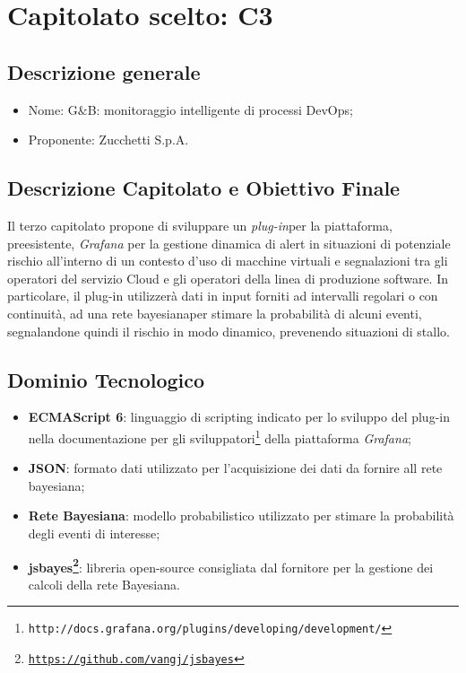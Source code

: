 \section{Capitolato scelto: C3}\label{CapScelto}

\subsection{Descrizione generale}
\begin{itemize}
	\item Nome: G$\&$B: monitoraggio intelligente di processi DevOps;
	\item Proponente: Zucchetti S.p.A.
\end{itemize}

\subsection{Descrizione Capitolato e Obiettivo Finale}
Il terzo capitolato propone di sviluppare un \textit{plug-in}\glossario per la piattaforma, preesistente, \textit{Grafana} per la gestione dinamica di alert in situazioni di potenziale rischio all'interno di un contesto d'uso di macchine virtuali e segnalazioni tra gli operatori del servizio Cloud e gli operatori della linea di produzione software.
In particolare, il plug-in  utilizzerà dati in input forniti ad intervalli regolari o con continuità, ad una rete bayesiana\glossario per stimare la probabilità di alcuni eventi, segnalandone quindi il rischio in modo dinamico, prevenendo situazioni di stallo.

\subsection{Dominio Tecnologico}
\begin{itemize}
	\item \textbf{ECMAScript 6\glossario}: linguaggio di scripting indicato per lo sviluppo del plug-in nella documentazione per gli sviluppatori\footnote{\texttt{http://docs.grafana.org/plugins/developing/development/}} della piattaforma \textit{Grafana};
	\item \textbf{JSON\glossario}: formato dati utilizzato per l'acquisizione dei dati da fornire all rete bayesiana;
	\item \textbf{Rete Bayesiana}: modello probabilistico utilizzato per stimare la probabilità degli eventi di interesse;
	\item \textbf{jsbayes\footnote{\hyperref[Link al repository GitHub]{\texttt{https://github.com/vangj/jsbayes}}}\glossario}: libreria open-source consigliata dal fornitore per la gestione dei calcoli della rete Bayesiana.
\end{itemize}

